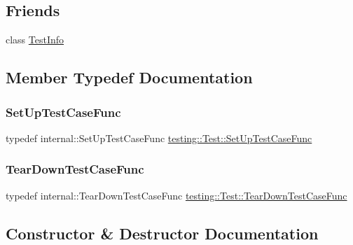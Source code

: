 \subsection*{Friends}
\begin{DoxyCompactItemize}
\item 
class \hyperlink{classtesting_1_1_test_a4c49c2cdb6c328e6b709b4542f23de3c}{Test\+Info}
\end{DoxyCompactItemize}


\subsection{Member Typedef Documentation}
\mbox{\label{classtesting_1_1_test_a5f2a051d1d99c9b784c666c586186cf9}} 
\subsubsection{\texorpdfstring{Set\+Up\+Test\+Case\+Func}{SetUpTestCaseFunc}}
{\footnotesize\ttfamily typedef internal\+::\+Set\+Up\+Test\+Case\+Func \hyperlink{classtesting_1_1_test_a5f2a051d1d99c9b784c666c586186cf9}{testing\+::\+Test\+::\+Set\+Up\+Test\+Case\+Func}}

\mbox{\label{classtesting_1_1_test_aa0f532e93b9f3500144c53f31466976c}} 
\subsubsection{\texorpdfstring{Tear\+Down\+Test\+Case\+Func}{TearDownTestCaseFunc}}
{\footnotesize\ttfamily typedef internal\+::\+Tear\+Down\+Test\+Case\+Func \hyperlink{classtesting_1_1_test_aa0f532e93b9f3500144c53f31466976c}{testing\+::\+Test\+::\+Tear\+Down\+Test\+Case\+Func}}



\subsection{Constructor \& Destructor Documentation}
\mbox{\label{classtesting_1_1_test_a2b0a62f1e667bbe8d8cb18d785bfa991}} 
